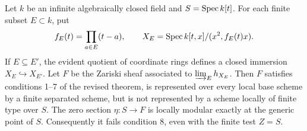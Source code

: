 \begin{theorem}\label{A:ind-thickening}
Let $k$ be an infinite algebraically closed field and $S=\operatorname{Spec} k[t]$.
For each finite subset $E\subset k$, put
\[
 f_E(t)=\prod_{a\in E}(t-a),\qquad
 X_E=\operatorname{Spec} k[t,x]/(x^2,f_E(t)x).
\]
If $E\subseteq E'$, the evident quotient of coordinate rings defines
a closed immersion $X_E\hookrightarrow X_{E'}$. Let $F$ be the
Zariski sheaf associated to $\varinjlim_E h_{X_E}$. Then $F$ satisfies
conditions 1--7 of the revised theorem, is represented over every local
base scheme by a finite separated scheme, but is not represented by a
scheme locally of finite type over $S$. The zero section
$\eta:S\to F$ is locally modular exactly at the generic point of $S$.
Consequently it fails condition 8, even with the finite test $Z=S$.
\end{theorem}
